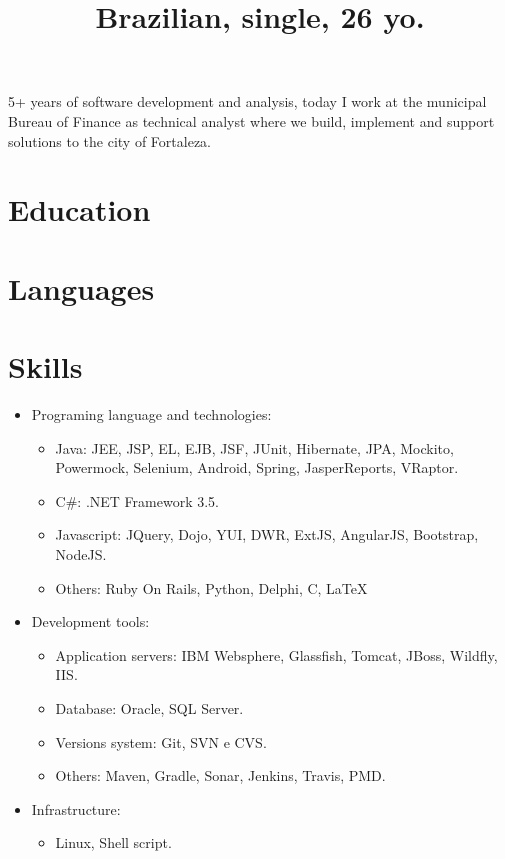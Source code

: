\documentclass[12pt,a4paper]{moderncv}
\title{\small Brazilian, single, 26 yo.}
\begin{document}
\makecvtitle

5+ years of software development and analysis, today I work at the municipal Bureau of Finance as technical analyst where we build, implement and support solutions to the city of Fortaleza.

\section{Education}

\section{Languages}

\section{Skills}
\begin{itemize}
\item Programing language and technologies:
  \begin{itemize}
  \item Java: JEE, JSP, EL, EJB, JSF, JUnit, Hibernate, JPA, Mockito, Powermock, Selenium, Android, Spring, JasperReports, VRaptor.
  \item C\#: .NET Framework 3.5.
  \item Javascript: JQuery, Dojo, YUI, DWR, ExtJS, AngularJS, Bootstrap, NodeJS.
  \item Others: Ruby On Rails, Python, Delphi, C, \LaTeX\
  \end{itemize}
\item Development tools:
   \begin{itemize}
      \item Application servers: IBM Websphere, Glassfish, Tomcat, JBoss, Wildfly, IIS.
      \item Database: Oracle, SQL Server.
      \item Versions system: Git, SVN e CVS.
      \item Others: Maven, Gradle, Sonar, Jenkins, Travis, PMD.
   \end{itemize}
\item Infrastructure:
   \begin{itemize}
         \item Linux, Shell script.
   \end{itemize}
\end{itemize}
\end{document}
